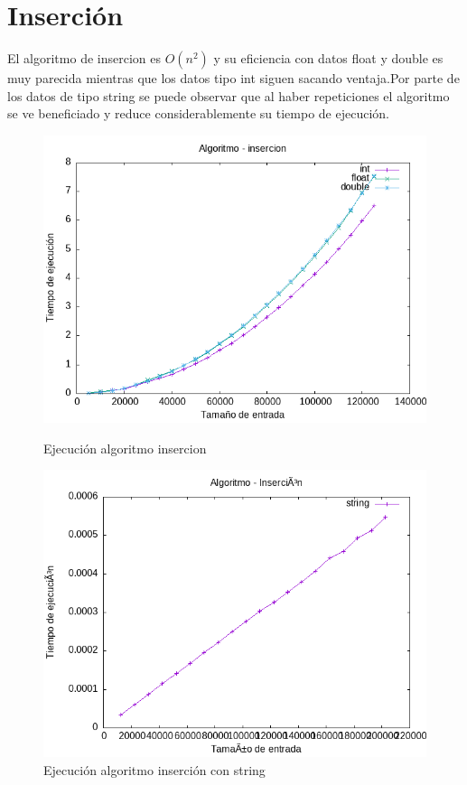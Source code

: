\documentclass[11pt,openany]{book}
\begin{document}
\section*{Inserción}
El algoritmo de insercion es \(O(n^2)\) y su eficiencia con datos float y double es muy parecida mientras que los datos tipo int 
siguen sacando ventaja.Por parte de los datos de tipo string se puede observar que al haber repeticiones el algoritmo se ve beneficiado y reduce 
considerablemente su tiempo de ejecución.
\begin{figure}[H]
    \begin{minipage}{0.5\textwidth}
        \centering
        \includegraphics[width=\linewidth]{assets/Img/insercion.png}
        \caption{Ejecución algoritmo insercion}
        \label{fig:insercion}
    \end{minipage}%
    \begin{minipage}{0.5\textwidth}
        \centering
        \includegraphics[width=\linewidth]{assets/Img/insercionstring.png}
        \caption{Ejecución algoritmo inserción con string}
        \label{fig:insercionstring}
    \end{minipage}
\end{figure}
\end{document}
